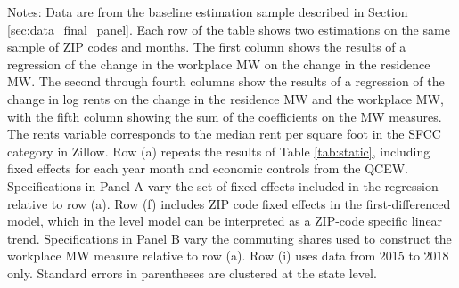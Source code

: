 \begin{landscape}
\begin{table}[ht!]
    \begin{minipage}{.95\linewidth} \footnotesize
        \vspace{2mm}
        Notes: 
        Data are from the baseline estimation sample described in Section 
        \ref{sec:data_final_panel}.
        Each row of the table shows two estimations on the same sample of ZIP 
        codes and months.
        The first column shows the results of a regression of the change in the 
        workplace MW on the change in the residence MW.
        The second through fourth columns show the results of a regression of 
        the change in log rents on the change in the residence MW and the 
        workplace MW, with the fifth column showing the sum of the coefficients 
        on the MW measures.
        The rents variable corresponds to the median rent per square foot in
        the SFCC category in Zillow.
        Row (a) repeats the results of Table \ref{tab:static}, including fixed
        effects for each year month and economic controls from the QCEW.
        Specifications in Panel A vary the set of fixed effects included in the 
        regression relative to row (a).
        Row (f) includes ZIP code fixed effects in the first-differenced model,
        which in the level model can be interpreted as a ZIP-code specific 
        linear trend.
        Specifications in Panel B vary the commuting shares used to construct 
        the workplace MW measure relative to row (a).
        Row (i) uses data from 2015 to 2018 only.
        Standard errors in parentheses are clustered at the state level.
    \end{minipage}
\end{table}
\end{landscape}
